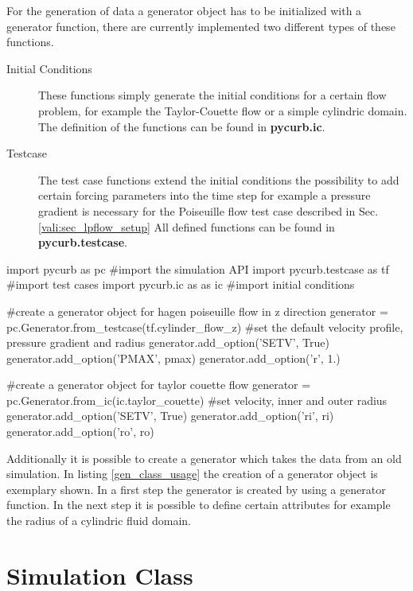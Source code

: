 For the generation of data a generator object has to be initialized with a generator function,
there are currently implemented two different types of these functions.

\begin{description}
\item[Initial  Conditions] These functions simply generate the initial conditions for a certain flow problem, for example the Taylor-Couette
                            flow or a simple cylindric domain. The definition of the functions can be found in \textbf{pycurb.ic}.
\item[Testcase] The test case functions extend the initial conditions the possibility to add certain forcing parameters into the time step
                for example a pressure gradient is necessary for the Poiseuille flow test case described in Sec. \ref{vali:sec_lpflow_setup}
                All defined functions can be found in \textbf{pycurb.testcase}.
\end{description}


\begin{python} [caption='Generator class usage', label={gen_class_usage}]
import pycurb as pc #import the simulation API
import pycurb.testcase as tf #import test cases
import pycurb.ic as as ic    #import initial conditions

#create a generator object for hagen poiseuille flow in z direction
generator = pc.Generator.from_testcase(tf.cylinder_flow_z)
#set the default velocity profile, pressure gradient and radius
generator.add_option('SETV', True)
generator.add_option('PMAX', pmax)
generator.add_option('r', 1.)

#create a generator object for taylor couette flow
generator = pc.Generator.from_ic(ic.taylor_couette)
#set velocity, inner and outer radius
generator.add_option('SETV', True)
generator.add_option('ri', ri)
generator.add_option('ro', ro)
\end{python}

Additionally it is possible to create a generator which takes the data from an old simulation. In listing \ref{gen_class_usage} the creation of a generator object is
exemplary shown. In a first step the generator is created by using a generator function. In the next step it is possible to define certain attributes
for example the radius of a cylindric fluid domain.

\section{Simulation Class}

